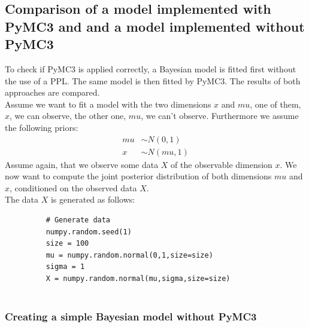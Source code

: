 \documentclass{article}
\begin{document}
\subsection{Comparison of a model implemented with PyMC3 and and a model implemented without PyMC3}
\label{subsec:Comparison}
To check if PyMC3 is applied correctly, a Bayesian model is fitted first without the use of a PPL. The same model is then fitted by PyMC3. The results of both approaches are compared.
\\
Assume we want to fit a model with the two dimensions $x$ and $mu$, one of them, $x$, we can observe, the other one, $mu$, we can't observe. Furthermore we assume the following priors:
\begin{equation}
\begin{split}
mu &\sim N(0,1)\\
x &\sim N(mu,1)
\end{split}
\end{equation}
Assume again, that we observe some data $X$ of the observable dimension $x$.
We now want to compute the joint posterior distribution of both dimensions $mu$ and $x$, conditioned on the observed data $X$.
\\
The data $X$ is generated as follows:\\
\begin{figure}[h]
	\begin{lstlisting}
	# Generate data
	numpy.random.seed(1)
	size = 100
	mu = numpy.random.normal(0,1,size=size)
	sigma = 1
	X = numpy.random.normal(mu,sigma,size=size)
	
	\end{lstlisting}
	\label{fig:groundtruth_example_code_data_generation}
\end{figure}
\subsubsection{Creating a simple Bayesian model without PyMC3}
\label{subsec: Complete example of a simple Bayesian model}
\end{document}
